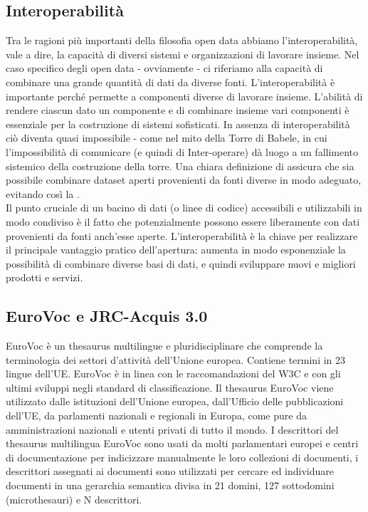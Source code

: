 \documentclass{article}
\theoremstyle{plain}
\theoremstyle{definition}
\begin{document}
\subsection{Interoperabilità}
Tra le ragioni più importanti della filosofia open data abbiamo l'interoperabilità, vale a dire, la capacità di diversi sistemi e organizzazioni di lavorare insieme. Nel caso specifico degli open data - ovviamente - ci riferiamo alla capacità di combinare una grande quantità di dati da diverse fonti. L'interoperabilità è importante perché permette a componenti diverse di lavorare insieme. L'abilità di rendere ciascun dato un componente e di combinare insieme vari componenti è essenziale per la costruzione di sistemi sofisticati. In assenza di interoperabilità ciò diventa quasi impossibile - come nel mito della Torre di Babele, in cui l'impossibilità di comunicare (e quindi di Inter-operare) dà luogo a un fallimento sistemico della costruzione della torre. Una chiara definizione di  assicura che sia possibile combinare dataset aperti provenienti da fonti diverse in modo adeguato, evitando così la .
\\
Il punto cruciale di un bacino di dati (o linee di codice) accessibili e utilizzabili in modo condiviso è il fatto che potenzialmente possono essere liberamente  con dati provenienti da fonti anch'esse aperte. L'interoperabilità è la chiave per realizzare il principale vantaggio pratico dell'apertura: aumenta in modo esponenziale la possibilità di combinare diverse basi di dati, e quindi sviluppare nuovi e migliori prodotti e servizi.
\footnotemark
{}

\subsection{EuroVoc e JRC-Acquis 3.0}
EuroVoc è un thesaurus multilingue e pluridisciplinare che comprende la terminologia dei settori d'attività dell'Unione europea. Contiene termini in 23 lingue dell'UE. EuroVoc è in linea con le raccomandazioni del W3C e con gli ultimi sviluppi negli standard di classificazione. Il thesaurus EuroVoc viene utilizzato dalle istituzioni dell'Unione europea, dall'Ufficio delle pubblicazioni dell'UE, da parlamenti nazionali e regionali in Europa, come pure da amministrazioni nazionali e utenti privati di tutto il mondo.
\footnotemark
{}
I descrittori del thesaurus multilingua EuroVoc sono usati da molti parlamentari europei e centri di documentazione per indicizzare manualmente le loro collezioni di documenti, i descrittori assegnati ai documenti sono utilizzati per cercare ed individuare documenti in una gerarchia semantica divisa in 21 domini, 127 sottodomini (microthesauri) e N descrittori.
\end{document}
